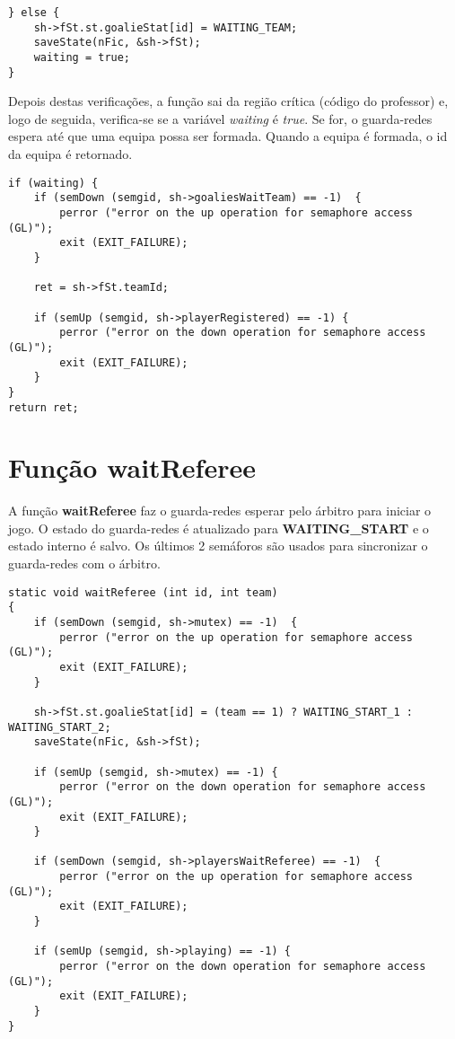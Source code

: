 \documentclass[code,math]{relatorio-deti}
\begin{document}
\begin{verbatim}
} else {
    sh->fSt.st.goalieStat[id] = WAITING_TEAM;
    saveState(nFic, &sh->fSt);
    waiting = true;
}
\end{verbatim}

Depois destas verificações, a função sai da região crítica (código do professor) e, logo de seguida, verifica-se se a variável \textit{waiting} é \textit{true}. Se for, o guarda-redes espera até que uma equipa possa ser formada. Quando a equipa é formada, o id da equipa é retornado. 

\begin{verbatim}
if (waiting) {
    if (semDown (semgid, sh->goaliesWaitTeam) == -1)  {
        perror ("error on the up operation for semaphore access (GL)");
        exit (EXIT_FAILURE);
    }

    ret = sh->fSt.teamId;

    if (semUp (semgid, sh->playerRegistered) == -1) {
        perror ("error on the down operation for semaphore access (GL)");
        exit (EXIT_FAILURE);
    }
}
return ret;
\end{verbatim}


\section{Função \textbf{waitReferee}}

A função \textbf{waitReferee} faz o guarda-redes esperar pelo árbitro para iniciar o jogo. O estado do guarda-redes é atualizado para \textbf{WAITING\_START} e o estado interno é salvo. Os últimos 2 semáforos são usados para sincronizar o guarda-redes com o árbitro.

\begin{verbatim}
static void waitReferee (int id, int team)
{
    if (semDown (semgid, sh->mutex) == -1)  {                                                     
        perror ("error on the up operation for semaphore access (GL)");
        exit (EXIT_FAILURE);
    }

    sh->fSt.st.goalieStat[id] = (team == 1) ? WAITING_START_1 : WAITING_START_2;
    saveState(nFic, &sh->fSt);

    if (semUp (semgid, sh->mutex) == -1) {                                                         
        perror ("error on the down operation for semaphore access (GL)");
        exit (EXIT_FAILURE);
    }

    if (semDown (semgid, sh->playersWaitReferee) == -1)  {                                                     
        perror ("error on the up operation for semaphore access (GL)");
        exit (EXIT_FAILURE);
    }

    if (semUp (semgid, sh->playing) == -1) {                                                         
        perror ("error on the down operation for semaphore access (GL)");
        exit (EXIT_FAILURE);
    }
}
\end{verbatim}
\end{document}
